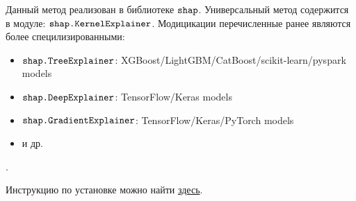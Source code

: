 Данный метод реализован в библиотеке $\verb|shap|$. Универсальный метод содержится в модуле: $\verb|shap.KernelExplainer|$. Модицикации перечисленные ранее являются более специлизированными:\\[-8mm]
\begin{itemize}
	\item $\verb|shap.TreeExplainer|$: XGBoost/LightGBM/CatBoost/scikit-learn/pyspark models\\[-7mm]
	\item $\verb|shap.DeepExplainer|$: TensorFlow/Keras models\\[-7mm]
	\item $\verb|shap.GradientExplainer|$: TensorFlow/Keras/PyTorch models\\[-7mm]
	\item и др.
\end{itemize}.

Инструкцию по установке можно найти \href{https://github.com/slundberg/shap}{здесь}.